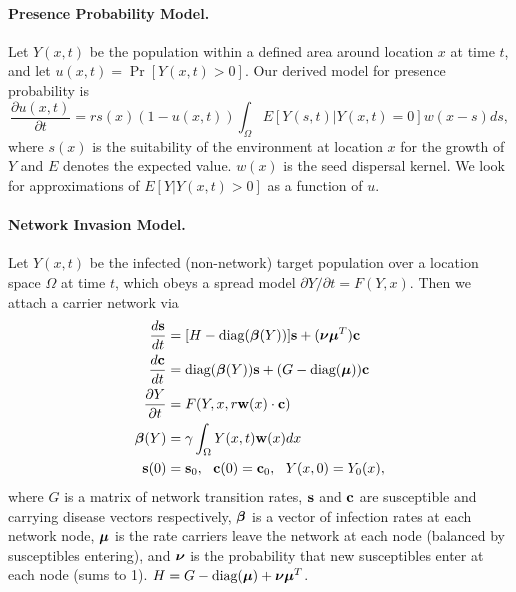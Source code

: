 \documentclass[11pt]{article}
\begin{document}
\paragraph{Presence Probability Model.} Let $Y(x,t)$ be the population within a defined area around location $x$ at time $t$, and let $u(x,t)=\Pr[Y(x,t)>0]$. Our derived model for presence probability is
\begin{equation}
\frac{\partial u(x,t)}{\partial t} = rs(x)(1-u(x,t))\int_\Omega E[Y(s,t)|Y(x,t)=0]w(x-s)ds,
\label{eqn:suitmodel}
\end{equation}
where $s(x)$ is the suitability of the environment at location $x$ for the growth of $Y$ and $E$ denotes the expected value. $w(x)$ is the seed dispersal kernel. We look for approximations of $E[Y|Y(x,t)>0]$ as a function of $u$.

\paragraph{Network Invasion Model.} Let $Y(x,t)$ be the infected (non-network) target population over a location space $\Omega$ at time $t$, which obeys a spread model $\partial Y / \partial t = F(Y,x)$. Then we attach a carrier network via
\begin{align}
\frac{d\mathbf{s}}{dt} &= [H - \mbox{diag}(\boldsymbol\beta(Y))]\mathbf{s} + (\boldsymbol\nu\boldsymbol\mu^T)\mathbf{c}\nonumber\\
\frac{d\mathbf{c}}{dt} &= \mbox{diag}(\boldsymbol\beta(Y))\mathbf{s} + (G - \mbox{diag}(\boldsymbol\mu))\mathbf{c} \nonumber\\
\frac{\partial Y}{\partial t} &= F(Y,x, r\mathbf{w}(x)\cdot\mathbf{c}) \label{eqn:SIY}\\
\boldsymbol\beta(Y) &= \gamma\int_\Omega Y(x,t)\mathbf{w}(x)dx\nonumber\\
\mathbf{s}(0) &= \mathbf{s}_0,\ \ \mathbf{c}(0) = \mathbf{c}_0,\ \ Y(x,0) = Y_0(x),\nonumber
\end{align}
where $G$ is a matrix of network transition rates, $\mathbf{s}$ and $\mathbf{c}$ are susceptible and carrying disease vectors respectively, $\boldsymbol\beta$ is a vector of infection rates at each network node, $\boldsymbol\mu$ is the rate carriers leave the network at each node (balanced by susceptibles entering), and $\boldsymbol\nu$ is the probability that new susceptibles enter at each node (sums to 1). $H = G - \mbox{diag}(\boldsymbol\mu) + \boldsymbol\nu\boldsymbol\mu^T$.
\end{document}
